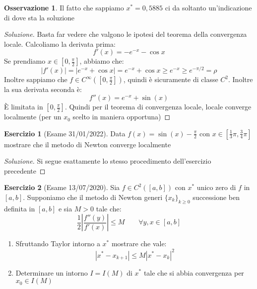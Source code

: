 \documentclass[11pt,a4paper,twoside]{article}
\theoremstyle{definition}
\newtheorem*{oss}{Osservazione}
\newtheorem*{ese}{Esercizio}
\newenvironment{sol}
	{\renewcommand\qedsymbol{$\blacksquare$}\begin{proof}[Soluzione]}
	{\end{proof}}
\begin{document}
\begin{oss}
	Il fatto che sappiamo $x^* = 0,5885$ ci da soltanto un'indicazione di dove sta la soluzione
\end{oss}

\begin{sol}
	Basta far vedere che valgono le ipotesi del teorema della convergenza locale. Calcoliamo la derivata prima:
	\[ f'(x) = -e^{-x} -\cos x \]
	Se prendiamo $x \in [0, \frac \pi 2]$, abbiamo che:
	\[ |f'(x)| = |e^{-x} + \cos x| = e^{-x} + \cos x \geq e^{-x} \geq e^{-\pi/2} = \rho \]
	Inoltre sappiamo che $f\in C^\infty([0, \frac \pi 2])$, quindi è sicuramente di classe $C^2$. Inoltre la sua derivata seconda è:
	\[ f''(x) = e^{-x} + \sin(x) \]
	È limitata in $[0, \frac \pi 2]$. Quindi per il teorema di convergenza locale, locale converge localmente (per un $x_0$ scelto in maniera opportuna)
\end{sol}

\begin{ese}[Esame 31/01/2022]
	Data $f(x) = \sin (x) - \frac \pi 2$ con $x \in [\frac 13 \pi, \frac 34 \pi]$ mostrare che il metodo di Newton converge localmente
\end{ese}

\begin{sol}
	Si segue esattamente lo stesso procedimento dell'esercizio precedente
\end{sol}

\begin{ese}[Esame 13/07/2020]
	Sia $f \in C^2([a,b])$ con $x^*$ unico zero di $f$ in $[a,b]$. Supponiamo che il metodo di Newton generi $\{x_k\}_{k \geq 0}$ successione ben definita in $[a,b]$ e sia $M>0$ tale che:
	\[ \frac 12 \left| \frac{f''(y)}{f'(x)} \right|\leq M \qquad \forall y,x \in [a,b] \]
	\begin{enumerate}
		\item Sfruttando Taylor intorno a $x^*$ mostrare che vale:
			\[ |x^*-x_{k+1}| \leq M|x^* - x_k|^2 \]
		\item Determinare un intorno $I = I(M)$ di $x^*$ tale che si abbia convergenza per $x_0 \in I(M)$
	\end{enumerate}
\end{ese}
\end{document}
